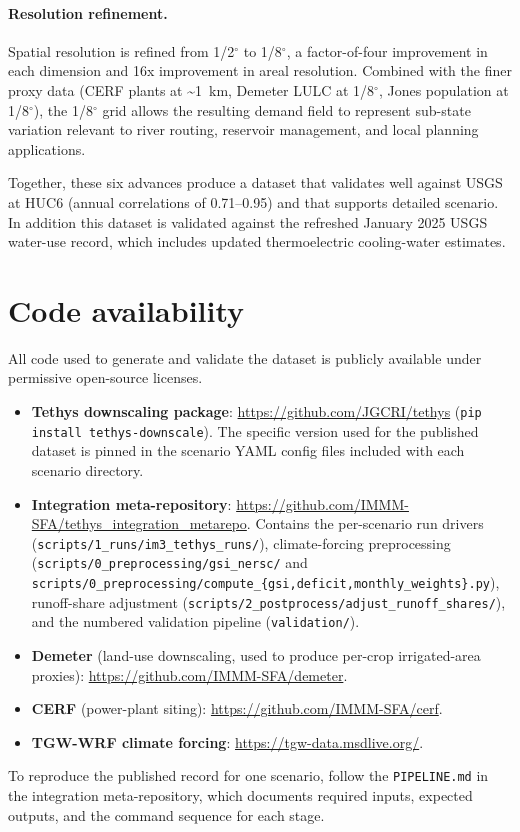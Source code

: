 \documentclass[fleqn,10pt]{wlscirep}
\begin{document}
\paragraph{Resolution refinement.} Spatial resolution is refined from 1/2$^{\circ}$ to 1/8$^{\circ}$, a factor-of-four improvement in each dimension and 16x improvement in areal resolution. Combined with the finer proxy data (CERF plants at \textasciitilde1~km, Demeter LULC at 1/8$^{\circ}$, Jones population at 1/8$^{\circ}$), the 1/8$^{\circ}$ grid allows the resulting demand field to represent sub-state variation relevant to river routing, reservoir management, and local planning applications.

Together, these six advances produce a dataset that validates well against USGS at HUC6 (annual correlations of 0.71--0.95) and that supports detailed scenario. In addition this dataset is validated against the refreshed January 2025 USGS water-use record, which includes updated thermoelectric cooling-water estimates\cite{skinnerWaterWithdrawalConsumption2025}.

\section*{Code availability}

All code used to generate and validate the dataset is publicly available under permissive open-source licenses.
\begin{itemize}
    \item \textbf{Tethys downscaling package}: \url{https://github.com/JGCRI/tethys} (\texttt{pip install tethys-downscale}). The specific version used for the published dataset is pinned in the scenario YAML config files included with each scenario directory.
    \item \textbf{Integration meta-repository}: \url{https://github.com/IMMM-SFA/tethys_integration_metarepo}. Contains the per-scenario run drivers (\texttt{scripts/1\_runs/im3\_tethys\_runs/}), climate-forcing preprocessing (\texttt{scripts/0\_preprocessing/gsi\_nersc/} and \texttt{scripts/0\_preprocessing/compute\_\{gsi,deficit,monthly\_weights\}.py}), runoff-share adjustment (\texttt{scripts/2\_postprocess/adjust\_runoff\_shares/}), and the numbered validation pipeline (\texttt{validation/}).
    \item \textbf{Demeter} (land-use downscaling, used to produce per-crop irrigated-area proxies): \url{https://github.com/IMMM-SFA/demeter}\cite{Vernon-2018}.
    \item \textbf{CERF} (power-plant siting): \url{https://github.com/IMMM-SFA/cerf}\cite{Vernon2021}.
    \item \textbf{TGW-WRF climate forcing}\cite{Jones2023TGW}: \url{https://tgw-data.msdlive.org/}.
\end{itemize}
To reproduce the published record for one scenario, follow the \texttt{PIPELINE.md} in the integration meta-repository, which documents required inputs, expected outputs, and the command sequence for each stage.
\end{document}
